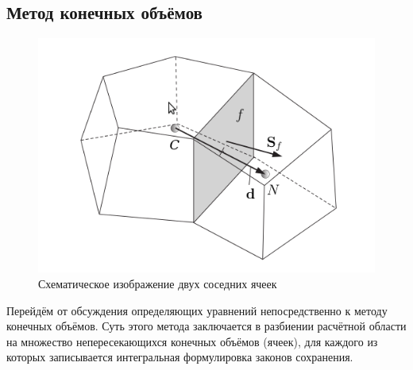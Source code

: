 \newpage
	\subsection{Метод конечных объёмов}
	\begin{figure}[h]
		\vspace{-1em}
			\centering
			\includegraphics[scale=0.5]{twoCells}
			\caption{Схематическое изображение двух соседних ячеек}
			\label{fig:twoCells}
		\end{figure}

		Перейдём от обсуждения определяющих уравнений непосредственно к методу конечных объёмов. Суть этого метода заключается в разбиении расчётной области на множество непересекающихся конечных объёмов (ячеек), для каждого из которых записывается интегральная формулировка законов сохранения.
		
